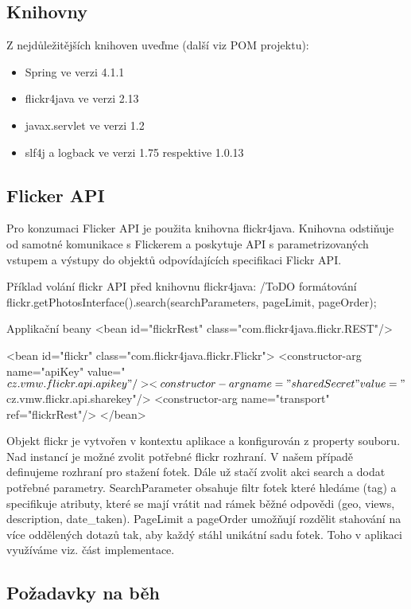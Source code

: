 \documentclass[12pt,oneside,a4paper]{article}
\begin{document}
\subsection{Knihovny}

Z nejdůležitějších knihoven uveďme (další viz POM projektu):
\begin{itemize}
	\item Spring ve verzi 4.1.1
	\item flickr4java ve verzi 2.13
	\item javax.servlet ve verzi 1.2
	\item slf4j a logback ve verzi 1.75 respektive 1.0.13
\end{itemize}

\subsection{Flicker API}

Pro konzumaci Flicker API je použita knihovna flickr4java. Knihovna odstiňuje od samotné komunikace s Flickerem a poskytuje API s parametrizovaných vstupem a výstupy do objektů odpovídajících specifikaci Flickr API. 

Příklad volání flickr API před knihovnu flickr4java:
/ToDO formátování
flickr.getPhotosInterface().search(searchParameters, pageLimit, pageOrder);

Applikační beany
  <bean id="flickrRest" class="com.flickr4java.flickr.REST"/>
  
  <bean id="flickr" class="com.flickr4java.flickr.Flickr">
  <constructor-arg name="apiKey" value="${cz.vmw.flickr.api.apikey}"/>
  <constructor-arg name="sharedSecret" value="${cz.vmw.flickr.api.sharekey}"/>
  <constructor-arg name="transport" ref="flickrRest"/>
  </bean>
  
Objekt flickr je vytvořen v kontextu aplikace a konfigurován z property souboru. Nad instancí je možné zvolit potřebné flickr rozhraní. V našem případě definujeme rozhraní pro stažení fotek. Dále už stačí zvolit akci search a dodat potřebné parametry. SearchParameter obsahuje filtr fotek které hledáme (tag) a specifikuje atributy, které se mají vrátit nad rámek běžné odpovědi (geo, views, description, date_taken). PageLimit a pageOrder umožňují rozdělit stahování na více oddělených dotazů tak, aby každý stáhl unikátní sadu fotek. Toho v aplikaci využíváme viz. část implementace.
 

\subsection{Požadavky na běh}
\end{document}
